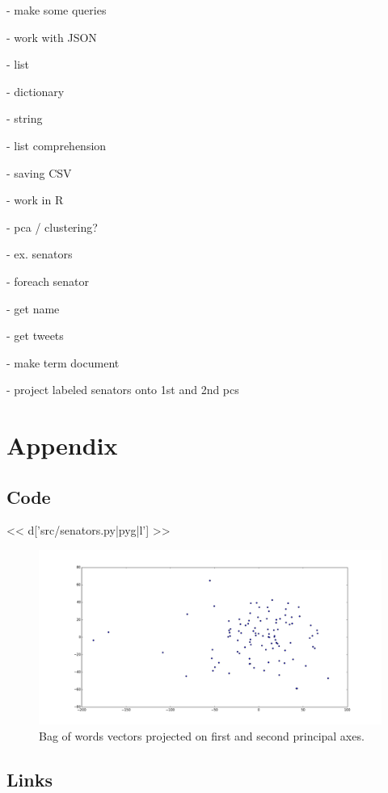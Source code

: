 - make some queries

- work with JSON

  - list

  - dictionary

  - string

  - list comprehension

- saving CSV

- work in R

  - pca / clustering?

- ex. senators

  - foreach senator

    - get name

    - get tweets

    - make term document

    - project labeled senators onto 1st and 2nd pcs

\newpage
\section*{Appendix}

\subsection*{Code}

<< d['src/senators.py|pyg|l'] >>

\begin{figure}[h]
\centering
  \includegraphics[width=0.9\linewidth]{fig/pca.png}
  \caption{Bag of words vectors projected on first and second principal axes.}\label{fig:pca}
\end{figure}


\newpage
\subsection*{Links}

